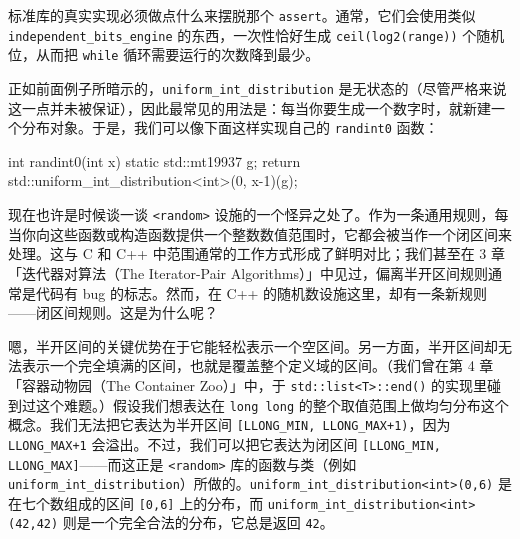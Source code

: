 标准库的真实实现必须做点什么来摆脱那个 \texttt{assert}。通常，它们会使用类似 \texttt{independent\_\allowbreak{}bits\_\allowbreak{}engine} 的东西，一次性恰好生成 \texttt{ceil(\allowbreak{}log2(\allowbreak{}range)\allowbreak{})\allowbreak{}} 个随机位，从而把 \texttt{while} 循环需要运行的次数降到最少。

正如前面例子所暗示的，\texttt{uniform\_\allowbreak{}int\_\allowbreak{}distribution} 是无状态的（尽管严格来说这一点并未被保证），因此最常见的用法是：每当你要生成一个数字时，就新建一个分布对象。于是，我们可以像下面这样实现自己的 \texttt{randint0} 函数：

\begin{codebox}[cpp]
    int randint0(int x) {
      static std::mt19937 g;
      return std::uniform_int_distribution<int>(0, x-1)(g);
    }
\end{codebox}

现在也许是时候谈一谈 \texttt{<random>\allowbreak{}} 设施的一个怪异之处了。作为一条通用规则，每当你向这些函数或构造函数提供一个整数数值范围时，它都会被当作一个闭区间来处理。这与 C 和 C++ 中范围通常的工作方式形成了鲜明对比；我们甚至在 3 章「迭代器对算法（The Iterator-Pair Algorithms）」中见过，偏离半开区间规则通常是代码有 bug 的标志。然而，在 C++ 的随机数设施这里，却有一条新规则——闭区间规则。这是为什么呢？

嗯，半开区间的关键优势在于它能轻松表示一个空区间。另一方面，半开区间却无法表示一个完全填满的区间，也就是覆盖整个定义域的区间。（我们曾在第 4 章「容器动物园（The Container Zoo）」中，于 \texttt{std::\allowbreak{}list<\allowbreak{}T>\allowbreak{}::\allowbreak{}end(\allowbreak{})\allowbreak{}} 的实现里碰到过这个难题。）假设我们想表达在 \texttt{long long} 的整个取值范围上做均匀分布这个概念。我们无法把它表达为半开区间 \texttt{[LLONG\_\allowbreak{}MIN,\allowbreak{} LLONG\_\allowbreak{}MAX+1)\allowbreak{}}，因为 \texttt{LLONG\_\allowbreak{}MAX+1} 会溢出。不过，我们可以把它表达为闭区间 \texttt{[LLONG\_\allowbreak{}MIN,\allowbreak{} LLONG\_\allowbreak{}MAX]}——而这正是 \texttt{<random>\allowbreak{}} 库的函数与类（例如 \texttt{uniform\_\allowbreak{}int\_\allowbreak{}distribution}）所做的。\texttt{uniform\_\allowbreak{}int\_\allowbreak{}distribution<\allowbreak{}int>\allowbreak{}(\allowbreak{}0,\allowbreak{}6)\allowbreak{}} 是在七个数组成的区间 \texttt{[0,\allowbreak{}6]} 上的分布，而 \texttt{uniform\_\allowbreak{}int\_\allowbreak{}distribution<\allowbreak{}int>\allowbreak{}(\allowbreak{}42,\allowbreak{}42)\allowbreak{}} 则是一个完全合法的分布，它总是返回 \texttt{42}。

